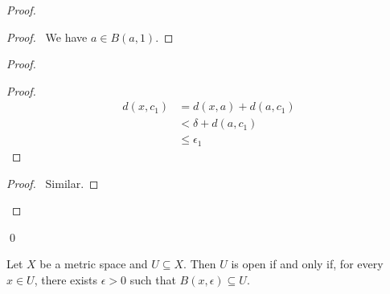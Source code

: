 \begin{proof}
    \pf
    \begin{proof}
        \pf\ We have $a \in B(a,1)$.
    \end{proof}
    \begin{proof}
        \begin{proof}
            \pf
            \begin{align*}
                d(x,c_1) & = d(x,a) + d(a,c_1) \\
                & < \delta + d(a,c_1) \\
                & \leq \epsilon_1
            \end{align*}
        \end{proof}
        \begin{proof}
            \pf\ Similar.
        \end{proof}
    \end{proof}
    \qed
\end{proof}

\begin{proposition}
    \label{proposition:open_in_metric_space}
    Let $X$ be a metric space and $U \subseteq X$. Then $U$ is open if and only if, for every $x \in U$, there exists $\epsilon > 0$ such that $B(x, \epsilon)
    \subseteq U$.
\end{proposition}


